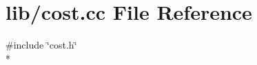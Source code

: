 \section{lib/cost.cc File Reference}
\label{cost_8cc}
{\ttfamily \#include \char`\"{}cost.\-h\char`\"{}}\\*
